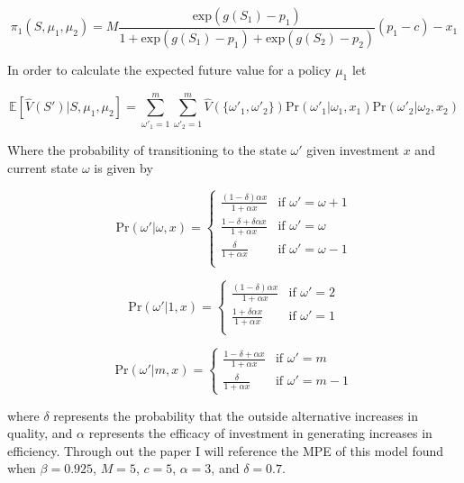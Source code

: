 \documentclass[12pt]{article}
\begin{document}
\begin{equation*}
  \pi_1(S,\mu_{1},\mu_{2})=M \frac{\text{exp}(g(S_1)-p_1)}{1+\text{exp}(g(S_1)-p_1)+\text{exp}(g(S_2)-p_2)} (p_1-c)-x_1
\end{equation*}

In order to calculate the expected future value for a policy $\mu_1$ let

\begin{equation*}
  \mathbb{E}[\hat{V}(S')|S,\mu_{1},\mu_{2}] = \sum_{\omega'_1=1}^m \sum_{\omega'_2=1}^m \hat{V}(\{\omega'_1,\omega'_2\}) \text{Pr}(\omega'_1|\omega_1,x_{1}) \text{Pr}(\omega'_2|\omega_2,x_{2})
\end{equation*}

Where the probability of transitioning to the state $\omega'$ given investment $x$ and current state $\omega$ is given by

\begin{equation*}
  \text{Pr}(\omega'|\omega,x) =
  \begin{cases}
    \frac{(1-\delta) \alpha x}{1+\alpha x} & \text{if } \omega'=\omega+1\\
    \frac{1-\delta+\delta \alpha x}{1+\alpha x} & \text{if } \omega' = \omega\\
    \frac{\delta}{1+\alpha x} & \text{if } \omega' = \omega-1\\
  \end{cases}
\end{equation*}

\begin{equation*}
  \text{Pr}(\omega'|1,x) =
  \begin{cases}
    \frac{(1-\delta) \alpha x}{1+\alpha x} & \text{if } \omega'=2\\
    \frac{1+\delta \alpha x}{1+\alpha x} & \text{if } \omega'=1\\
  \end{cases}
\end{equation*}

\begin{equation*}
  \text{Pr}(\omega'|m,x) =
  \begin{cases}
    \frac{1-\delta+\alpha x}{1+\alpha x} & \text{if } \omega'=m\\
    \frac{\delta}{1+\alpha x} & \text{if } \omega'=m-1
  \end{cases}
\end{equation*}

where $\delta$ represents the probability that the outside alternative increases in quality, and $\alpha$ represents the efficacy of investment in generating increases in efficiency. Through out the paper I will reference the MPE of this model found when $\beta=0.925$, $M=5$, $c=5$, $\alpha=3$, and $\delta=0.7$.
\end{document}

